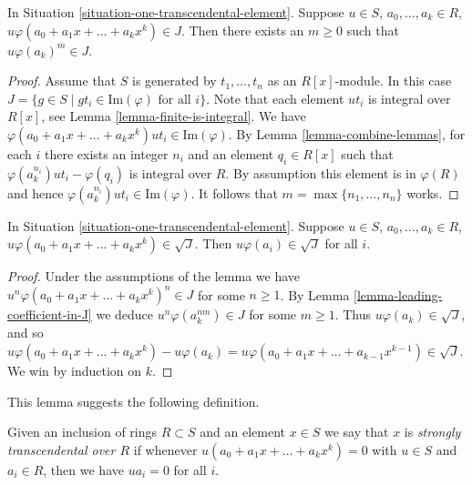\begin{lemma}
\label{lemma-leading-coefficient-in-J}
In Situation \ref{situation-one-transcendental-element}.
Suppose $u \in S$, $a_0,\ldots, a_k \in R$,
$u \varphi(a_0 + a_1x + \ldots + a_k x^k) \in J$.
Then there exists an $m \geq 0$ such that
$u \varphi(a_k)^m \in J$.
\end{lemma}

\begin{proof}
Assume that $S$ is generated by $t_1,\ldots, t_n$
as an $R[x]$-module. In this case
$J = \{ g \in S \mid gt_i \in \text{Im}(\varphi)\text{ for all }i\}$.
Note that each element $u t_i$ is integral over
$R[x]$, see Lemma \ref{lemma-finite-is-integral}.
We have $\varphi(a_0 + a_1x + \ldots + a_k x^k) u t_i \in
\text{Im}(\varphi)$. By Lemma \ref{lemma-combine-lemmas}, for
each $i$ there exists an integer $n_i$ and an element
$q_i \in R[x]$ such that $\varphi(a_k^{n_i}) u t_i - \varphi(q_i)$
is integral over $R$. By assumption this element is in $\varphi(R)$
and hence $\varphi(a_k^{n_i}) u t_i \in \text{Im}(\varphi)$.
It follows that $m = \max\{n_1,\ldots,n_n\}$ works.
\end{proof}

\begin{lemma}
\label{lemma-all-coefficients-in-J}
In Situation \ref{situation-one-transcendental-element}.
Suppose $u \in S$, $a_0,\ldots, a_k \in R$,
$u \varphi(a_0 + a_1x + \ldots + a_k x^k) \in \sqrt{J}$.
Then $u \varphi(a_i) \in \sqrt{J}$ for all $i$.
\end{lemma}

\begin{proof}
Under the assumptions of the lemma we have
$u^n \varphi(a_0 + a_1x + \ldots + a_k x^k)^n \in J$ for
some $n \geq 1$. By Lemma \ref{lemma-leading-coefficient-in-J}
we deduce $u^n \varphi(a_k^{nm}) \in J$ for some $m \geq 1$.
Thus $u \varphi(a_k) \in \sqrt{J}$, and so
$u \varphi(a_0 + a_1x + \ldots + a_k x^k) - u \varphi(a_k) =
u \varphi(a_0 + a_1x + \ldots + a_{k-1} x^{k-1}) \in \sqrt{J}$.
We win by induction on $k$.
\end{proof}

\noindent
This lemma suggests the following definition.

\begin{definition}
\label{definition-strongly-transcendental}
Given an inclusion of rings $R \subset S$ and
an element $x \in S$ we say that $x$ is
{\it strongly transcendental over $R$} if
whenever $u(a_0 + a_1 x + \ldots + a_k x^k) = 0$
with $u \in S$ and $a_i \in R$, then
we have $ua_i = 0$ for all $i$.
\end{definition}

